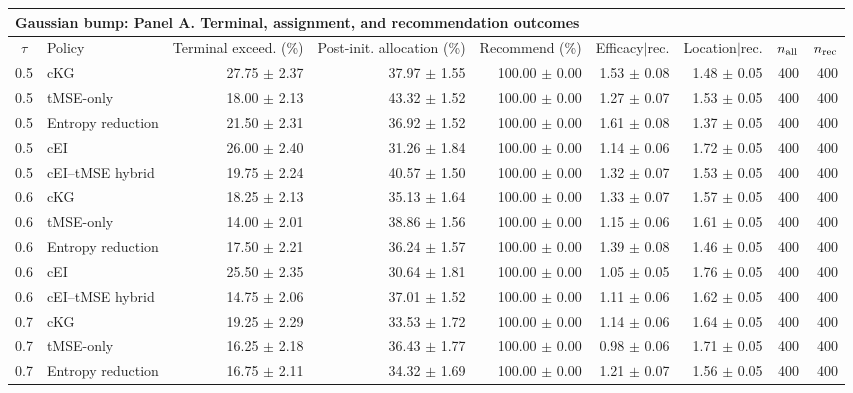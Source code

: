 \bigskip

\begin{tabular}{@{}clrrrrrrr@{}}
\multicolumn{9}{l}{\textbf{Gaussian bump: Panel A. Terminal, assignment, and recommendation outcomes}} \\
\toprule
$\tau$ & Policy & Terminal exceed. (\%) & Post-init. allocation (\%) & Recommend (\%) & Efficacy$\mid$rec. & Location$\mid$rec. & $n_{\rm all}$ & $n_{\rm rec}$ \\
\midrule
0.5 & cKG & 27.75 $\pm$ 2.37 & 37.97 $\pm$ 1.55 & 100.00 $\pm$ 0.00 & 1.53 $\pm$ 0.08 & 1.48 $\pm$ 0.05 & 400 & 400 \\
0.5 & tMSE-only & 18.00 $\pm$ 2.13 & 43.32 $\pm$ 1.52 & 100.00 $\pm$ 0.00 & 1.27 $\pm$ 0.07 & 1.53 $\pm$ 0.05 & 400 & 400 \\
0.5 & Entropy reduction & 21.50 $\pm$ 2.31 & 36.92 $\pm$ 1.52 & 100.00 $\pm$ 0.00 & 1.61 $\pm$ 0.08 & 1.37 $\pm$ 0.05 & 400 & 400 \\
0.5 & cEI & 26.00 $\pm$ 2.40 & 31.26 $\pm$ 1.84 & 100.00 $\pm$ 0.00 & 1.14 $\pm$ 0.06 & 1.72 $\pm$ 0.05 & 400 & 400 \\
0.5 & cEI--tMSE hybrid & 19.75 $\pm$ 2.24 & 40.57 $\pm$ 1.50 & 100.00 $\pm$ 0.00 & 1.32 $\pm$ 0.07 & 1.53 $\pm$ 0.05 & 400 & 400 \\
0.6 & cKG & 18.25 $\pm$ 2.13 & 35.13 $\pm$ 1.64 & 100.00 $\pm$ 0.00 & 1.33 $\pm$ 0.07 & 1.57 $\pm$ 0.05 & 400 & 400 \\
0.6 & tMSE-only & 14.00 $\pm$ 2.01 & 38.86 $\pm$ 1.56 & 100.00 $\pm$ 0.00 & 1.15 $\pm$ 0.06 & 1.61 $\pm$ 0.05 & 400 & 400 \\
0.6 & Entropy reduction & 17.50 $\pm$ 2.21 & 36.24 $\pm$ 1.57 & 100.00 $\pm$ 0.00 & 1.39 $\pm$ 0.08 & 1.46 $\pm$ 0.05 & 400 & 400 \\
0.6 & cEI & 25.50 $\pm$ 2.35 & 30.64 $\pm$ 1.81 & 100.00 $\pm$ 0.00 & 1.05 $\pm$ 0.05 & 1.76 $\pm$ 0.05 & 400 & 400 \\
0.6 & cEI--tMSE hybrid & 14.75 $\pm$ 2.06 & 37.01 $\pm$ 1.52 & 100.00 $\pm$ 0.00 & 1.11 $\pm$ 0.06 & 1.62 $\pm$ 0.05 & 400 & 400 \\
0.7 & cKG & 19.25 $\pm$ 2.29 & 33.53 $\pm$ 1.72 & 100.00 $\pm$ 0.00 & 1.14 $\pm$ 0.06 & 1.64 $\pm$ 0.05 & 400 & 400 \\
0.7 & tMSE-only & 16.25 $\pm$ 2.18 & 36.43 $\pm$ 1.77 & 100.00 $\pm$ 0.00 & 0.98 $\pm$ 0.06 & 1.71 $\pm$ 0.05 & 400 & 400 \\
0.7 & Entropy reduction & 16.75 $\pm$ 2.11 & 34.32 $\pm$ 1.69 & 100.00 $\pm$ 0.00 & 1.21 $\pm$ 0.07 & 1.56 $\pm$ 0.05 & 400 & 400 \\

\end{tabular}
